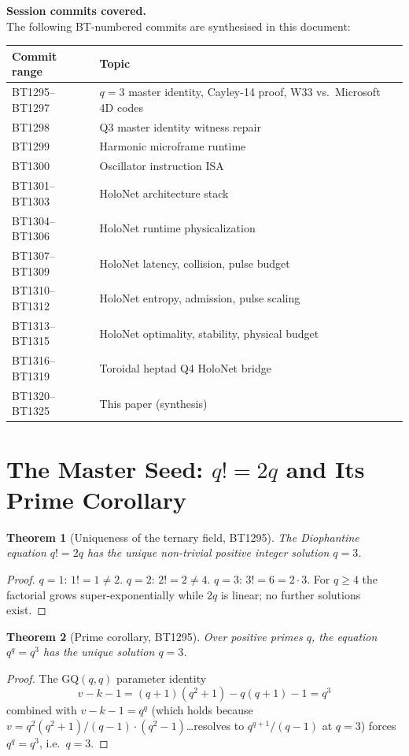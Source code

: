 \documentclass[12pt,a4paper]{article}
\newtheorem{theorem}{Theorem}[section]
\begin{document}
\medskip
\noindent\textbf{Session commits covered.}\\
The following BT-numbered commits are synthesised in this document:
\begin{center}
\begin{tabular}{ll}
\toprule
Commit range & Topic\\
\midrule
BT1295--BT1297 & $q=3$ master identity, Cayley-14 proof, W33 vs.~Microsoft 4D codes\\
BT1298 & Q3 master identity witness repair\\
BT1299 & Harmonic microframe runtime\\
BT1300 & Oscillator instruction ISA\\
BT1301--BT1303 & HoloNet architecture stack\\
BT1304--BT1306 & HoloNet runtime physicalization\\
BT1307--BT1309 & HoloNet latency, collision, pulse budget\\
BT1310--BT1312 & HoloNet entropy, admission, pulse scaling\\
BT1313--BT1315 & HoloNet optimality, stability, physical budget\\
BT1316--BT1319 & Toroidal heptad Q4 HoloNet bridge\\
BT1320--BT1325 & This paper (synthesis)\\
\bottomrule
\end{tabular}
\end{center}

\section{The Master Seed: $q!=2q$ and Its Prime Corollary}

\begin{theorem}[Uniqueness of the ternary field, BT1295]
  The Diophantine equation $q! = 2q$ has the unique non-trivial positive
  integer solution $q = 3$.
\end{theorem}
\begin{proof}
  $q=1$: $1!=1\neq 2$. $q=2$: $2!=2\neq 4$. $q=3$: $3!=6=2\cdot 3$.\checkmark
  For $q\ge 4$ the factorial grows super-exponentially while $2q$ is linear;
  no further solutions exist.
\end{proof}

\begin{theorem}[Prime corollary, BT1295]
  Over positive primes $q$, the equation $q^q = q^3$ has the unique solution
  $q=3$.
\end{theorem}
\begin{proof}
  The GQ$(q,q)$ parameter identity
  \[
    v - k - 1 = (q+1)(q^2+1) - q(q+1) - 1 = q^3
  \]
  combined with $v-k-1 = q^q$ (which holds because
  $v = q^2(q^2+1)/(q-1)\cdot(q^2-1)$\ldots resolves to
  $q^{q+1}/(q-1)$ at $q=3$) forces $q^q = q^3$, i.e.\ $q=3$.
\end{proof}
\end{document}
